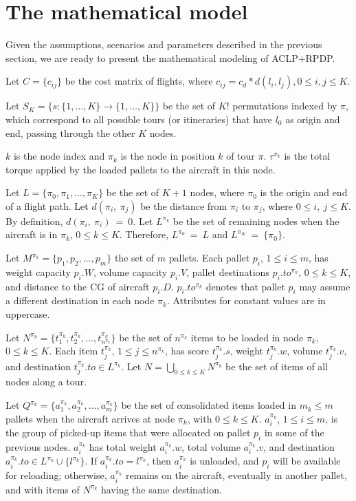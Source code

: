 \documentclass[preprint,authoryear]{elsarticle}
\begin{document}
\section{The mathematical model}
\label{sec4}

Given the assumptions, scenarios and parameters described in the previous section, we are ready to present the mathematical modeling of ACLP+RPDP.

Let $C=\{c_{ij}\}$ be the cost matrix of flights, where $c_{ij} = c_d*d(l_i,l_j), 0 \leq i,j \leq K$.

Let $S_K = \{s: \{1, \dots, K\} \rightarrow \{1, \dots, K\} \}$ be the set of $K!$ permutations {\color{blue} indexed by $\pi$}, which correspond to all possible tours (or itineraries) that have $l_0$ as origin and end, passing through the other $K$ nodes.

{\color{blue}
$k$ is the node index and $\pi_k$ is the node in position $k$ of tour $\pi$. $\tau^{\pi_k}$ is the total torque applied by the loaded pallets to the aircraft in this node. 


Let $L = \{ \pi_0, \pi_1, \ldots, \pi_K \}$ be the set of $K+1$ nodes, where $\pi_0$ is the origin and end of a flight path. Let $d(\pi_i,\ \pi_j)$ be the distance from $\pi_i$ to $\pi_j$, where $0 \leq i,\ j \leq K$. By definition, $d(\pi_i,\ \pi_i)\ =\ 0$.
Let $L^{\pi_k}$ be the set of remaining nodes when the aircraft is in $\pi_k$, $0 \leq k \leq K$. Therefore, $L^{\pi_0}\ =\ L$ and $L^{\pi_K}\ =\ \{ \pi_0 \}$.
}

Let $M^{\pi_k} = \{p_1, p_2, \ldots, p_m \}$ the set of $m$ pallets. Each pallet $p_i$, $1 \leq i \leq m$, has weight capacity $p_i.W$, volume capacity $p_i.V$, pallet destinations $p_i.to^{\pi_k}$, $0 \leq k \leq K$, and distance to the CG of aircraft $p_i.D$. $p_i.to^{\pi_k}$ denotes that pallet $p_i$ may assume a different destination in each node ${\pi_k}$. Attributes for constant values are in uppercase.

Let $N^{\pi_k} = \{t^{\pi_k}_1, t^{\pi_k}_2, \ldots, t^{\pi_k}_{n^{\pi_k}} \}$ be the set of $n^{\pi_k}$ items to be loaded in node $\pi_k$, $0 \leq k \leq K$. Each item $t^{\pi_k}_j$, $1 \leq j \leq n^{\pi_k}$, has score $t^{\pi_k}_j.s$, weight $t^{\pi_k}_j.w$, volume $t^{\pi_k}_j.v$, and destination $t^{\pi_k}_j.to \in L^{\pi_k}$. Let $N = \bigcup_{0 \leq k \leq K} N^{\pi_k}$ be the set of items of all nodes along a tour.

Let $Q^{\pi_k} = \{a^{\pi_k}_1, a^{\pi_k}_2, \ldots, a^{\pi_k}_{m} \}$ be the set of consolidated items loaded in $m_k \leq m$ pallets when the aircraft arrives at node $\pi_k$, with $0 \leq k \leq K$. $a^{\pi_k}_i$, $1 \leq i \leq m$, is the group of picked-up items that were allocated on pallet $p_i$ in some of the previous nodes. $a^{\pi_k}_i$ has total weight $a^{\pi_k}_i.w$, total volume $a^{\pi_k}_i.v$, and destination $a^{\pi_k}_i.to \in L^{\pi_k} \cup \{l^{\pi_k}\}$. If $a^{\pi_k}_i.to = l^{\pi_k}$, then $a^{\pi_k}_i$ is unloaded, and $p_i$ will be available for reloading; otherwise, $a^{\pi_k}_i$ remains on the aircraft, eventually in another pallet, and with items of $N^{\pi_k}$ having the same destination.
\end{document}
